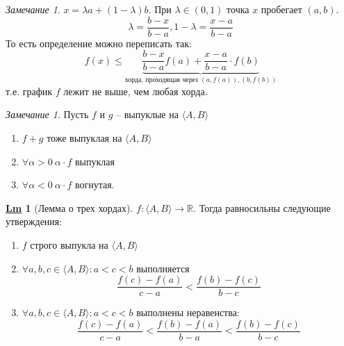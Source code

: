 \documentclass[12pt]{article}
\newenvironment{MyList}[1][4pt]{
  \begin{enumerate}[1.]
  \setlength{\parskip}{0pt}
  \setlength{\itemsep}{#1}
}{       
  \end{enumerate}
}
\def\R{\mathbb{R}}       %
\theoremstyle{definition} %
\newtheorem{Lm}[Thm]{\underline{Lm}} %
\theoremstyle{plain} %
\theoremstyle{remark} %
\newtheorem{Rem}[Thm]{Замечание} %
\begin{document}
\begin{Rem}
    $x = \lambda a + (1 - \lambda) b$.
    При $\lambda \in (0, 1)$ точка $x$ пробегает $(a, b)$.
    \[\lambda = \frac{b - x}{b - a}, 1 - \lambda = \frac{x - a}{b - a}\]
    То есть определение можно переписать так:
    \[f(x) \leqslant \underbrace{\frac{b - x}{b - a}f(a) + \frac{x - a}{b - a} \cdot f(b)}_{\text{хорда, проходящая через }(a, f(a)), (b, f(b))}\]
    т.е. график $f$ лежит не выше, чем любая хорда.
\end{Rem}

\begin{Rem}
    Пусть $f$ и $g$ -- выпуклые на $\langle A, B\rangle$
    \begin{MyList}
        \item $f + g$ тоже выпуклая на $\langle A, B\rangle$ 
        \item $\forall \alpha > 0 \ \alpha \cdot f$ выпуклая
        \item $\forall \alpha < 0 \ \alpha \cdot f$ вогнутая.
    \end{MyList}
\end{Rem}

\begin{Lm}[Лемма о трех хордах]
    $f : \langle A, B\rangle \to \R$. Тогда равносильны следующие утверждения:

    \begin{MyList}
        \item $f$ строго выпукла на $\langle A, B\rangle$ 
        \item $\forall a, b, c \in \langle A, B\rangle : a < c < b$ выполняется
        \[ \frac{f(c) - f(a)}{c - a} < \frac{f(b) - f(c)}{b - c}\] 

        \item $\forall a, b, c \in \langle A, B\rangle : a < c < b$ выполнены неравенства:
        \[ \frac{f(c) - f(a)}{c - a} < \frac{f(b) - f(a)}{b - a} < \frac{f(b) - f(c)}{b - c}\]
    \end{MyList}
\end{Lm}
\end{document}
